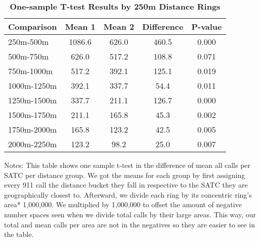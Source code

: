 \begin{table}[htbp]
\centering
\begin{tabular}{l|c c c c}
\hline
Comparison & Mean 1 & Mean 2 & Difference & P-value \\
\hline
250m-500m & 1086.6 & 626.0 & 460.5 & 0.000 \\
500m-750m & 626.0 & 517.2 & 108.8 & 0.071 \\
750m-1000m & 517.2 & 392.1 & 125.1 & 0.019 \\
1000m-1250m & 392.1 & 337.7 & 54.4 & 0.011 \\
1250m-1500m & 337.7 & 211.1 & 126.7 & 0.000 \\
1500m-1750m & 211.1 & 165.8 & 45.3 & 0.002 \\
1750m-2000m & 165.8 & 123.2 & 42.5 & 0.005 \\
2000m-2250m & 123.2 & 98.2 & 25.0 & 0.007 \\
\hline
\end{tabular}
\caption{\textbf{One-sample T-test Results by 250m Distance Rings}}
\label{tab:ttests_250}  
\centering\small{Notes: This table shows one sample t-test in the difference of mean all calls per SATC per distance group. We got the means for each group by first assigning every 911 call the distance bucket they fall in respective to the SATC they are geographically closest to. Afterward, we divide each ring by its concentric ring's area* 1,000,000. We multiplied by 1,000,000 to offset the amount of negative number spaces seen when we divide total calls by their large areas. This way, our total and mean calls per area are not in the negatives so they are easier to see in the table. }
\end{table}
